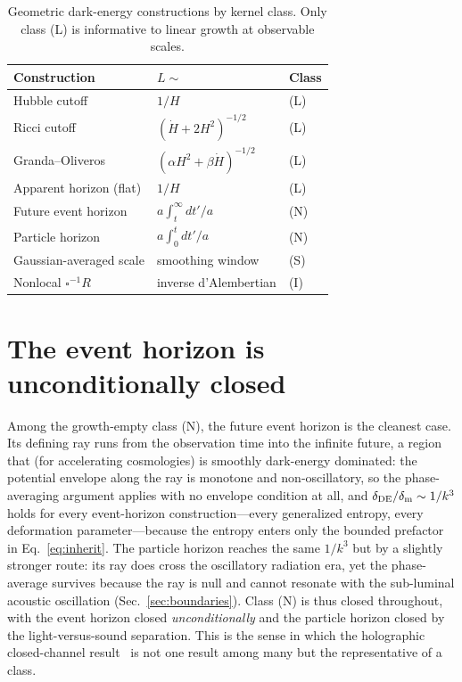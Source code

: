 \documentclass[twocolumn,10pt]{article}
\newcommand{\dDE}{\delta_{\rm DE}}
\newcommand{\dm}{\delta_{\rm m}}
\begin{document}
\begin{table}[!t]
\caption{Geometric dark-energy constructions by kernel class. Only class (L)
is informative to linear growth at observable scales.}
\label{tab:classes}
\begin{center}\small
\begin{tabular}{lll}\hline\hline
Construction & $L\sim$ & Class \\ \hline
Hubble cutoff & $1/H$ & (L) \\
Ricci cutoff & $(\dot H+2H^2)^{-1/2}$ & (L) \\
Granda--Oliveros & $(\alpha H^2+\beta\dot H)^{-1/2}$ & (L) \\
Apparent horizon (flat) & $1/H$ & (L) \\
Future event horizon & $a\!\int_t^\infty\!dt'/a$ & (N) \\
Particle horizon & $a\!\int_0^t\!dt'/a$ & (N) \\
Gaussian-averaged scale & smoothing window & (S) \\
Nonlocal $\square^{-1}R$ & inverse d'Alembertian & (I) \\
\hline\hline
\end{tabular}
\end{center}
\end{table}

\section{The event horizon is unconditionally closed}
\label{sec:eventhorizon}

Among the growth-empty class (N), the future event horizon is the cleanest
case. Its defining ray runs from the observation time into the infinite future,
a region that (for accelerating cosmologies) is smoothly dark-energy dominated:
the potential envelope along the ray is monotone and non-oscillatory, so the
phase-averaging argument applies with no envelope condition at all, and
$\dDE/\dm\sim1/k^3$ holds for every event-horizon construction---every
generalized entropy, every deformation parameter---because the entropy enters
only the bounded prefactor in Eq.~\eqref{eq:inherit}. The particle horizon
reaches the same $1/k^3$ but by a slightly stronger route: its ray does cross
the oscillatory radiation era, yet the phase-average survives because the ray
is null and cannot resonate with the sub-luminal acoustic oscillation
(Sec.~\ref{sec:boundaries}). Class (N) is thus closed throughout, with the
event horizon closed \emph{unconditionally} and the particle horizon closed
by the light-versus-sound separation. This is the sense in which the
holographic closed-channel result~\cite{CompanionPaper} is not one result among
many but the representative of a class.
\end{document}
